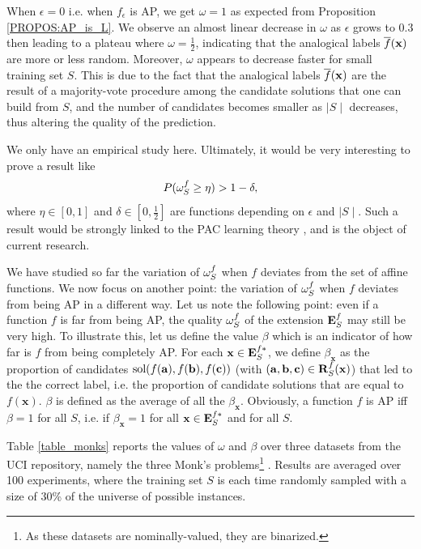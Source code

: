 When $\epsilon = 0$ i.e. when $f_\epsilon$ is AP, we get $\omega = 1$ as expected from
Proposition \ref{PROPOS:AP_is_L}. We observe an almost linear decrease in $\omega$ as
$\epsilon$ grows to $0.3$ then leading to a plateau where $\omega =
\frac{1}{2}$, indicating that the analogical labels $\overline{f}(\mathbf{x})$ are
more or less random. Moreover, $\omega$ appears to decrease faster for small
training set $S$. This is due to the fact that the analogical labels
$\overline{f}(\mathbf{x})$ are the result of a majority-vote procedure among the
candidate solutions that one can build from $S$, and the number of candidates
becomes smaller as $\mid S\mid$ decreases, thus altering the quality of the
prediction.

We only have an empirical study here. Ultimately, it would be very interesting
to prove a result like
$$P(\omega_{S}^{f} \geq \eta) > 1 - \delta,$$
where $\eta \in [0, 1]$ and $\delta \in [0, \frac{1}{2}]$ are functions
depending on $\epsilon$ and $\mid S \mid$. Such a result would be strongly
linked to the PAC learning theory \cite{Val72}, and is the object of current
research.



We have studied so far the variation of $\omega_{S}^{f}$ when $f$ deviates from
the set of affine functions. We now focus on another point: the variation of
$\omega_{S}^{f}$ when $f$ deviates from being AP in a different way.
Let us note the following point: even if a function $f$ is far from being
AP, the quality $\omega_{S}^{f}$ of the extension $\mathbf{E}_{S}^{f}$ may still be very
high. To illustrate this, let us define the value $\beta$ which is an indicator
of how far is $f$ from being completely AP.  For each $\mathbf{x} \in
\mathbf{E}_{S}^{f*}$, we define $\beta_\mathbf{x}$ as the proportion of
candidates $\text{sol}(f(\mathbf{a}), f(\mathbf{b}), f(\mathbf{c}))$ (with
$(\mathbf{a}, \mathbf{b}, \mathbf{c}) \in \mathbf{R}_{S}^{f}(\mathbf{x})$) that led to the the correct
label, i.e. the proportion of candidate solutions that are equal to
$f(\mathbf{x})$. $\beta$ is defined as the average of all the
$\beta_\mathbf{x}$.  Obviously, a function $f$ is AP iff $\beta = 1$ for all
$S$, i.e. if $\beta_\mathbf{x} = 1$ for all $\mathbf{x} \in \mathbf{E}_{S}^{f*}$
and for all $S$.

Table \ref{table_monks} reports the values of $\omega$ and $\beta$ over three
datasets from the UCI repository, namely the three Monk's problems\footnote{As
these datasets are nominally-valued, they are binarized.} \cite{UCIrepo}.
Results are averaged over 100 experiments, where the training set $S$ is each
time randomly sampled with a size of $30$\% of the universe of possible
instances.

